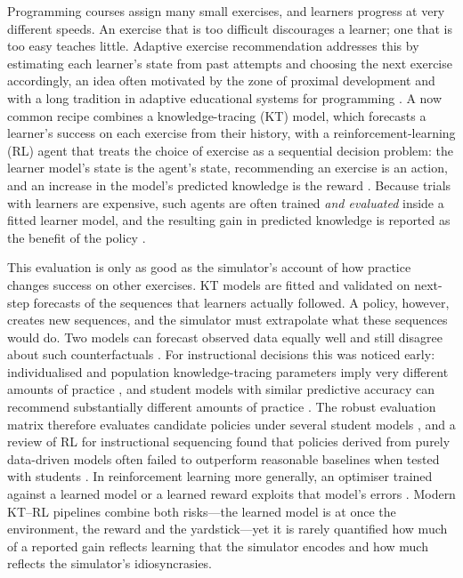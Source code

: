 \documentclass[a4paper,preprint,12pt,authoryear]{elsarticle}
\begin{document}
Programming courses assign many small exercises, and learners progress at very different speeds. An exercise that is too difficult discourages a learner; one that is too easy teaches little. Adaptive exercise recommendation addresses this by estimating each learner's state from past attempts and choosing the next exercise accordingly, an idea often motivated by the zone of proximal development \citep{vygotsky1978mind} and with a long tradition in adaptive educational systems for programming \citep{brusilovsky2007user,hsiao2010guiding}. A now common recipe combines a knowledge-tracing (KT) model, which forecasts a learner's success on each exercise from their history, with a reinforcement-learning (RL) agent that treats the choice of exercise as a sequential decision problem: the learner model's state is the agent's state, recommending an exercise is an action, and an increase in the model's predicted knowledge is the reward \citep{huang2019dre,liu2019cseal,ai2019cdkt,chen2023src,li2023gehrl,ozyurt2025exrec}. Because trials with learners are expensive, such agents are often trained \emph{and evaluated} inside a fitted learner model, and the resulting gain in predicted knowledge is reported as the benefit of the policy \citep{cheng2026unier}.

This evaluation is only as good as the simulator's account of how practice changes success on other exercises. KT models are fitted and validated on next-step forecasts of the sequences that learners actually followed. A policy, however, creates new sequences, and the simulator must extrapolate what these sequences would do. Two models can forecast observed data equally well and still disagree about such counterfactuals \citep{breiman2001two,damour2022underspecification}. For instructional decisions this was noticed early: individualised and population knowledge-tracing parameters imply very different amounts of practice \citep{lee2012individualizing}, and student models with similar predictive accuracy can recommend substantially different amounts of practice \citep{rollinson2015predictive}. The robust evaluation matrix therefore evaluates candidate policies under several student models \citep{doroudi2017rem}, and a review of RL for instructional sequencing found that policies derived from purely data-driven models often failed to outperform reasonable baselines when tested with students \citep{doroudi2019reward}. In reinforcement learning more generally, an optimiser trained against a learned model or a learned reward exploits that model's errors \citep{kurutach2018metrpo,janner2019trust,gao2023scaling}. Modern KT--RL pipelines combine both risks---the learned model is at once the environment, the reward and the yardstick---yet it is rarely quantified how much of a reported gain reflects learning that the simulator encodes and how much reflects the simulator's idiosyncrasies.
\end{document}
